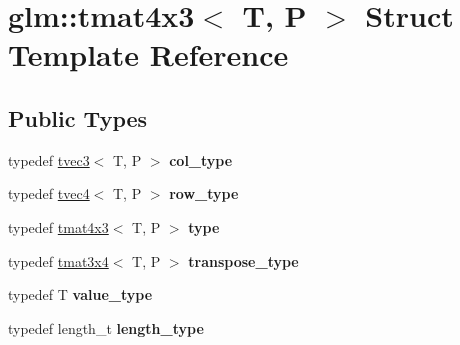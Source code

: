 \hypertarget{structglm_1_1tmat4x3}{\section{glm\-:\-:tmat4x3$<$ T, P $>$ Struct Template Reference}
\label{structglm_1_1tmat4x3}
}
\subsection*{Public Types}
\begin{DoxyCompactItemize}
\item 
\hypertarget{structglm_1_1tmat4x3_ac64f78f27c32014f7d72233969526430}{typedef \hyperlink{structglm_1_1tvec3}{tvec3}$<$ T, P $>$ {\bfseries col\-\_\-type}}\label{structglm_1_1tmat4x3_ac64f78f27c32014f7d72233969526430}

\item 
\hypertarget{structglm_1_1tmat4x3_aeed2de6aadeb405b11529071cddb9fe9}{typedef \hyperlink{structglm_1_1tvec4}{tvec4}$<$ T, P $>$ {\bfseries row\-\_\-type}}\label{structglm_1_1tmat4x3_aeed2de6aadeb405b11529071cddb9fe9}

\item 
\hypertarget{structglm_1_1tmat4x3_a3aedff8ef82d31052444d388ededef55}{typedef \hyperlink{structglm_1_1tmat4x3}{tmat4x3}$<$ T, P $>$ {\bfseries type}}\label{structglm_1_1tmat4x3_a3aedff8ef82d31052444d388ededef55}

\item 
\hypertarget{structglm_1_1tmat4x3_a367488f91f7e419b75ddee7fe2d44a20}{typedef \hyperlink{structglm_1_1tmat3x4}{tmat3x4}$<$ T, P $>$ {\bfseries transpose\-\_\-type}}\label{structglm_1_1tmat4x3_a367488f91f7e419b75ddee7fe2d44a20}

\item 
\hypertarget{structglm_1_1tmat4x3_ad877c31a46be38d67ef6e93881c44ecf}{typedef T {\bfseries value\-\_\-type}}\label{structglm_1_1tmat4x3_ad877c31a46be38d67ef6e93881c44ecf}

\item 
\hypertarget{structglm_1_1tmat4x3_a2f1ac502cc552a921a905e8a858fb1d7}{typedef length\-\_\-t {\bfseries length\-\_\-type}}\label{structglm_1_1tmat4x3_a2f1ac502cc552a921a905e8a858fb1d7}

\end{DoxyCompactItemize}
